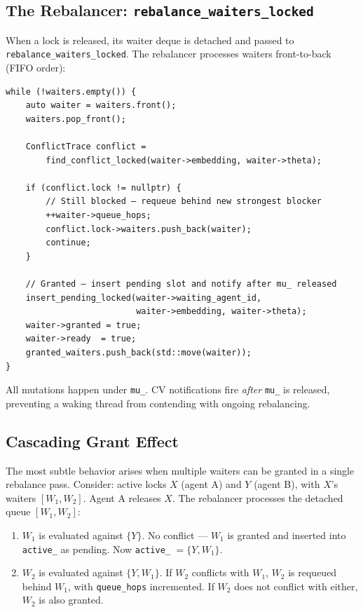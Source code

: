 \documentclass[sigconf]{acmart}
\begin{document}
\subsection{The Rebalancer: \texttt{rebalance\_\-waiters\_\-locked}}
\label{sec:rebalancer}

When a lock is released, its waiter deque is detached and passed to
\texttt{rebalance\_\-waiters\_\-locked}. The rebalancer processes waiters front-to-back
(FIFO order):

\begin{lstlisting}[caption={Rebalancer core loop}]
while (!waiters.empty()) {
    auto waiter = waiters.front();
    waiters.pop_front();

    ConflictTrace conflict =
        find_conflict_locked(waiter->embedding, waiter->theta);

    if (conflict.lock != nullptr) {
        // Still blocked — requeue behind new strongest blocker
        ++waiter->queue_hops;
        conflict.lock->waiters.push_back(waiter);
        continue;
    }

    // Granted — insert pending slot and notify after mu_ released
    insert_pending_locked(waiter->waiting_agent_id,
                          waiter->embedding, waiter->theta);
    waiter->granted = true;
    waiter->ready  = true;
    granted_waiters.push_back(std::move(waiter));
}
\end{lstlisting}

\noindent All mutations happen under \texttt{mu\_}. CV notifications fire \emph{after}
\texttt{mu\_} is released, preventing a waking thread from contending with ongoing
rebalancing.

\subsection{Cascading Grant Effect}
\label{sec:cascade}

The most subtle behavior arises when multiple waiters can be granted in a single
rebalance pass. Consider: active locks $X$ (agent A) and $Y$ (agent B), with
$X$'s waiters $[W_1, W_2]$. Agent A releases $X$. The rebalancer processes the detached
queue $[W_1, W_2]$:

\begin{enumerate}
\item $W_1$ is evaluated against $\{Y\}$. No conflict — $W_1$ is granted and inserted
  into \texttt{active\_} as pending. Now \texttt{active\_} $= \{Y, W_1\}$.
\item $W_2$ is evaluated against $\{Y, W_1\}$. If $W_2$ conflicts with $W_1$,
  $W_2$ is requeued behind $W_1$, with \texttt{queue\_hops} incremented.
  If $W_2$ does not conflict with either, $W_2$ is also granted.
\end{enumerate}
\end{document}
